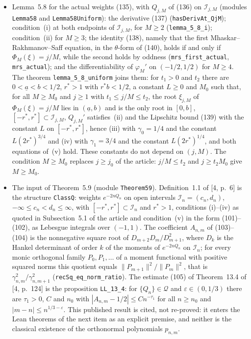 \documentclass[11pt,a4paper]{article}
\newcommand{\eq}[1]{(#1)}
\begin{document}
\begin{itemize}
\item Lemma~5.8 for the actual weights \eq{135}, with $Q_{j,M}$ of \eq{136} on $\mathcal I_{j,M}$ (modules \texttt{Lemma58} and \texttt{Lemma58Uniform}): the derivative \eq{137} (\texttt{hasDerivAt\_QjM}); condition~(i) at both endpoints of $\mathcal I_{j,M}$, for $M\geq2$ (\texttt{lemma\_5\_8\_i}); condition~(ii) for $M\geq3$; the identity \eq{138}, namely that the first Mhaskar--Rakhmanov--Saff equation, in the $\theta$-form of \eq{140}, holds if and only if $\Phi_M(\xi)=j/M$, while the second holds by oddness (\texttt{mrs\_first\_actual}, \texttt{mrs\_actual}); and the differentiability of $\varphi_M'$ on $(-1/2,1/2)$ for $M\geq4$. The theorem \texttt{lemma\_5\_8\_uniform} joins them: for $t_1>0$ and $t_2$ there are $0<\underline a<b<1/2$, $r^*>1$ with $r^*b<1/2$, a constant $L\geq0$ and $M_0$ such that, for all $M\geq M_0$ and $j\geq1$ with $t_1\leq j/M\leq t_2$, the root $\xi_{j,M}$ of $\Phi_M(\xi)=j/M$ lies in $(\underline a,b)$ and is the only root in $[0,b]$, $[-r^*,r^*]\subset\mathcal I_{j,M}$, $Q_{j,M}'$ satisfies~(ii) and the Lipschitz bound \eq{139} with the constant $L$ on $[-r^*,r^*]$, hence (iii) with $\gamma_0=1/4$ and the constant $L(2r^*)^{3/4}$ and (iv) with $\gamma_1=3/4$ and the constant $L(2r^*)^{1/4}$, and both equations of~(v) hold. These constants do not depend on $(j,M)$. The condition $M\geq M_0$ replaces $j\geq j_0$ of the article: $j/M\leq t_2$ and $j\geq t_2M_0$ give $M\geq M_0$.
\item The input of Theorem~5.9 (module \texttt{Theorem59}). Definition~1.1 of [4, p.~6] is the structure \texttt{ClassQ}: weights $e^{-2nQ_n}$ on open intervals $\mathcal I_n=(c_n,d_n)$, $-\infty\leq c_n<d_n\leq\infty$, with $[-r^*,r^*]\subset\mathcal I_n$ and $r^*>1$, conditions (i)--(iv) as quoted in Subsection~5.1 of the article and condition~(v) in the form \eq{101}--\eq{102}, as Lebesgue integrals over $(-1,1)$. The coefficient $A_{n,m}$ of \eq{103}--\eq{104} is the nonnegative square root of $D_{m+2}D_m/D_{m+1}^2$, where $D_k$ is the Hankel determinant of order $k$ of the moments of $e^{-2nQ_n}$ on $\mathcal I_n$; for every monic orthogonal family $P_0,P_1,\dots$ of a moment functional with positive squared norms this quotient equals $\|P_{m+1}\|^2/\|P_m\|^2$, that is $\gamma_{n,m}^2/\gamma_{n,m+1}^2$ (\texttt{recSq\_eq\_norm\_ratio}). The estimate \eq{105} of Theorem~13.4 of [4, p.~124] is the proposition \texttt{LL\_13\_4}: for $\{Q_n\}\in\mathcal Q$ and $\varepsilon\in(0,1/3)$ there are $\tau_1>0$, $C$ and $n_0$ with $|A_{n,m}-1/2|\leq Cn^{-\tau_1}$ for all $n\geq n_0$ and $|m-n|\leq n^{1/3-\varepsilon}$. This published result is cited, not re-proved: it enters the Lean theorems of the next item as an explicit premise, and neither is the classical existence of the orthonormal polynomials $p_{n,m}$.

\end{itemize}
\end{document}
